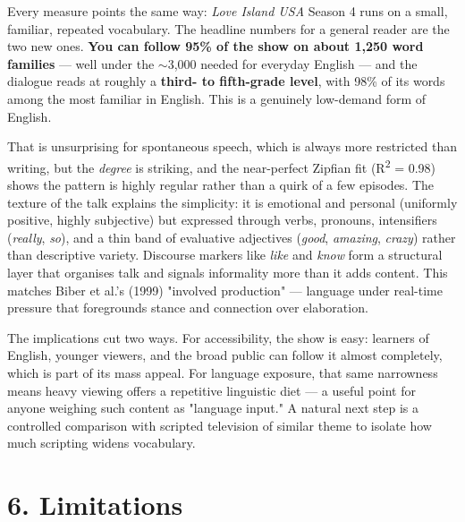 \documentclass[11pt]{article}
\begin{document}
Every measure points the same way: \emph{Love Island USA} Season 4 runs on a small, familiar, repeated vocabulary. The headline numbers for a general reader are the two new ones. \textbf{You can follow 95\% of the show on about 1,250 word families} --- well under the $\sim$3,000 needed for everyday English --- and the dialogue reads at roughly a \textbf{third- to fifth-grade level}, with 98\% of its words among the most familiar in English. This is a genuinely low-demand form of English.

That is unsurprising for spontaneous speech, which is always more restricted than writing, but the \emph{degree} is striking, and the near-perfect Zipfian fit (R\textsuperscript{2} = 0.98) shows the pattern is highly regular rather than a quirk of a few episodes. The texture of the talk explains the simplicity: it is emotional and personal (uniformly positive, highly subjective) but expressed through verbs, pronouns, intensifiers (\emph{really}, \emph{so}), and a thin band of evaluative adjectives (\emph{good}, \emph{amazing}, \emph{crazy}) rather than descriptive variety. Discourse markers like \emph{like} and \emph{know} form a structural layer that organises talk and signals informality more than it adds content. This matches Biber et al.'s (1999) "involved production" --- language under real-time pressure that foregrounds stance and connection over elaboration.

The implications cut two ways. For accessibility, the show is easy: learners of English, younger viewers, and the broad public can follow it almost completely, which is part of its mass appeal. For language exposure, that same narrowness means heavy viewing offers a repetitive linguistic diet --- a useful point for anyone weighing such content as "language input." A natural next step is a controlled comparison with scripted television of similar theme to isolate how much scripting widens vocabulary.


\section*{6. Limitations}
\end{document}
